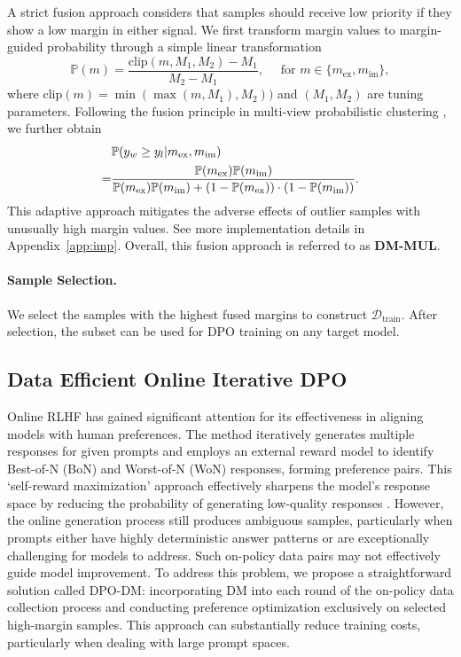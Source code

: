 A strict fusion approach considers that samples should receive low priority if they show a low margin in either signal. We first transform margin values to margin-guided probability through a simple linear transformation
$$
\mathbb{P}(m) = \frac{\mathrm{clip}(m, M_1, M_2) - M_1}{M_2 - M_1}, \quad \text{ for } m \in \{m_{\mathrm{ex}}, m_{\mathrm{im}}\},
$$
where $\mathrm{clip}(m) = \min(\max(m, M_1), M_2))$ and $(M_1, M_2)$ are tuning parameters. Following the fusion principle in multi-view probabilistic clustering \citep{deng2024a3s}, we further obtain 
\begin{align}
   &\mathbb{P}(y_w\ge y_l | m_\mathrm{ex},m_\mathrm{im})  \notag\\
   =&\frac{\mathbb{P}(m_\mathrm{ex})\mathbb{P}(m_\mathrm{im})}{\mathbb{P}(m_\mathrm{ex})\mathbb{P}(m_\mathrm{im})+(1-\mathbb{P}(m_\mathrm{ex}))\cdot(1-\mathbb{P}(m_\mathrm{im}))}.
    \label{eq:mul}
\end{align}
This adaptive approach mitigates the adverse effects of outlier samples with unusually high margin values. See more implementation details in Appendix~\ref{app:imp}. Overall, this fusion approach is referred to as \textbf{DM-MUL}.

\paragraph{Sample Selection.} We select the samples with the highest fused margins to construct $\mathcal{D}_{\mathrm{train}}$. After selection, the subset can be used for DPO training on any target model.

\subsection{Data Efficient Online Iterative DPO} 
\label{methd:online}

Online RLHF \citep{xiong2024iterative} has gained significant attention for its effectiveness in aligning models with human preferences. The method iteratively generates multiple responses for given prompts and employs an external reward model to identify Best-of-N (BoN) and Worst-of-N (WoN) responses, forming preference pairs. This `self-reward maximization' approach effectively sharpens the model's response space by reducing the probability of generating low-quality responses \citep{huang2024self}. However, the online generation process still produces ambiguous samples, particularly when prompts either have highly deterministic answer patterns or are exceptionally challenging for models to address. Such on-policy data pairs may not effectively guide model improvement. To address this problem, we propose a straightforward solution called DPO-DM: incorporating DM into each round of the on-policy data collection process and conducting preference optimization exclusively on selected high-margin samples. This approach can substantially reduce training costs, particularly when dealing with large prompt spaces.
